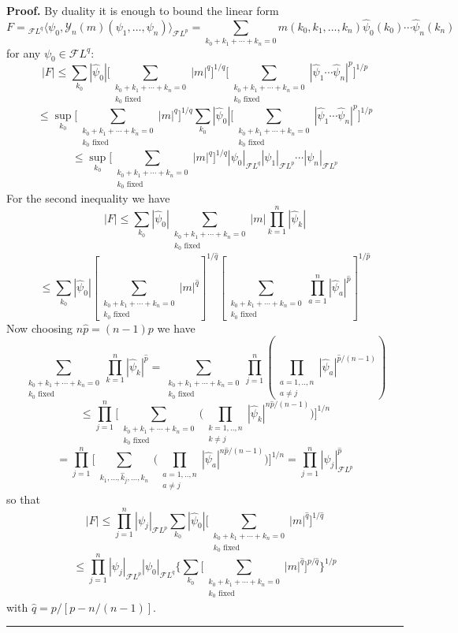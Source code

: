 \documentclass[a4paper,11pt,reqno]{article}
\newcommand{\FF}{\mathcal{F}}
\newcommand{\YY}{\mathcal{Y}}
\newenvironment{proof}[1][Proof]{\textbf{#1.} }{\ \rule{0.5em}{0.5em}}
\begin{document}
\begin{proof}
By duality it is enough to bound the linear form
$$
F={}_{\FF L^q}\langle \psi_0,\YY_n(m)(\psi_1,\dots,\psi_n)\rangle_{\FF L^p}= \sum_{k_0+k_1+\cdots+k_n=0} m(k_0,k_1,\dots,k_n) \hat \psi_0(k_0)\cdots \hat \psi_n(k_n)
$$
for any $\psi_0 \in \FF L^q$:
$$
|F|\le \sum_{k_0}| \hat \psi_0| \big[\sum_{\substack{k_0+k_1+\cdots+k_n=0\\ k_0 \text{ fixed}}} |m |^q \big]^{1/q}\big[\sum_{\substack{k_0+k_1+\cdots+k_n=0\\ k_0 \text{ fixed}}} |\hat \psi_1 \cdots \hat \psi_n|^p\big]^{1/p}
$$
$$
\le \sup_{k_0} \big[\sum_{\substack{k_0+k_1+\cdots+k_n=0\\ k_0 \text{ fixed}}} |m |^q \big]^{1/q} \sum_{k_0} |\hat \psi_0|
\big[\sum_{\substack{k_0+k_1+\cdots+k_n=0\\ k_0 \text{ fixed}}} | \hat \psi_1\cdots \hat \psi_n|^p\big]^{1/p}
$$
$$
\le \sup_{k_0} \big[\sum_{\substack{k_0+k_1+\cdots+k_n=0\\ k_0 \text{ fixed}}} |m |^q \big]^{1/q}  |\psi_0|_{\FF L^q}  |\psi_1|_{\FF L^p}\cdots  |\psi_n|_{\FF L^p}
$$
For the second inequality we have
$$
|F|\le\sum_{k_0}  |\hat \psi_0|  \sum_{\substack{k_0+k_1+\cdots+k_n=0\\ k_0 \text{ fixed}}} |m| \prod_{k=1}^n |\hat \psi_k|
$$
$$
\le
\sum_{k_0}  |\hat \psi_0| [\sum_{\substack{k_0+k_1+\cdots+k_n=0\\ k_0 \text{ fixed}}} |m|^{\hat q}]^{1/\hat q}[\sum_{\substack{k_0+k_1+\cdots+k_n=0\\ k_0 \text{ fixed}}} \prod_{a=1}^n |\hat \psi_a|^{\hat p}]^{1/\hat p}
$$
Now choosing $n \hat p = (n-1)p$ we have
$$
\sum_{\substack{k_0+k_1+\cdots+k_n=0\\ k_0 \text{ fixed}}} \prod_{k=1}^n |\hat \psi_k|^{\hat p}
=
\sum_{\substack{k_0+k_1+\cdots+k_n=0\\ k_0 \text{ fixed}}} \prod_{j=1}^n(\prod_{\substack{a=1,..,n\\a\neq j}} |\hat \psi_a|^{\hat p/(n-1)})
$$
$$
\le\prod_{j=1}^n \big[ \sum_{\substack{k_0+k_1+\cdots+k_n=0\\ k_0 \text{ fixed}}} \big(\prod_{\substack{k=1,..,n\\k\neq j}} |\hat \psi_k|^{n \hat p/(n-1)}\big)\big]^{1/n}
$$
$$
=\prod_{j=1}^n \big[ \sum_{\substack{k_1,\dots,\hat k_j,\dots,k_n}} \big(\prod_{\substack{a=1,..,n\\a\neq j}} |\hat \psi_a|^{n \hat p/(n-1)}\big)\big]^{1/n}=\prod_{j=1}^n |\psi_j |_{\FF L^p}^{\hat p}
$$
so that
$$
|F|\le\prod_{j=1}^n |\psi_j |_{\FF L^p}
\sum_{k_0}  |\hat \psi_0|  \big[\sum_{\substack{k_0+k_1+\cdots+k_n=0\\ k_0 \text{ fixed}}} |m|^{\hat q} \big]^{1/\hat q}
$$
$$ \le \prod_{j=1}^n |\psi_j |_{\FF L^p} |\psi_0|_{\FF L^q} \big 
\{\sum_{k_0}\big[\sum_{\substack{k_0+k_1+\cdots+k_n=0\\ k_0 \text{ fixed}}} |m|^{\hat q} \big]^{p/\hat q} \big\}^{1/p}
$$
with $\hat q = p/[p-n/(n-1)]$.
\end{proof}
\end{document}
